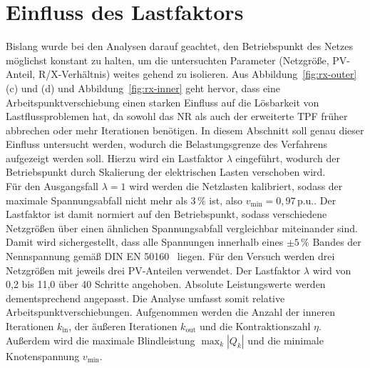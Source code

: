 \section{Einfluss des Lastfaktors}
\label{sec:lastfaktor}

Bislang wurde bei den Analysen darauf geachtet, den Betriebspunkt des Netzes möglichst konstant zu halten, um die untersuchten Parameter (Netzgröße, PV-Anteil, R/X-Verhältnis) weites gehend zu isolieren.
Aus Abbildung~\ref{fig:rx-outer} (c) und (d) und Abbildung~\ref{fig:rx-inner} geht hervor, dass eine Arbeitspunktverschiebung einen starken Einfluss auf die Lösbarkeit von Lastflussproblemen hat, da sowohl das NR als auch der erweiterte TPF früher abbrechen oder mehr Iterationen benötigen.
In diesem Abschnitt soll genau dieser Einfluss untersucht werden, wodurch die Belastungsgrenze des Verfahrens aufgezeigt werden soll.
Hierzu wird ein Lastfaktor $\lambda$ eingeführt, wodurch der Betriebspunkt durch Skalierung der elektrischen Lasten verschoben wird.\\


Für den Ausgangsfall $\lambda=1$ wird werden die Netzlasten kalibriert, sodass der maximale Spannungsabfall nicht mehr als $3\,\%$ ist, also $v_\mathrm{min}=0,97\,$p.u..
Der Lastfaktor ist damit normiert auf den Betriebspunkt, sodass verschiedene Netzgrößen über einen ähnlichen Spannungsabfall vergleichbar miteinander sind.
Damit wird sichergestellt, dass alle Spannungen innerhalb eines $\pm5\,\%$ Bandes der Nennspannung gemäß DIN EN 50160~\cite{50160} liegen.
Für den Versuch werden drei Netzgrößen mit jeweils drei PV-Anteilen verwendet.
Der Lastfaktor $\lambda$ wird von  0,2 bis 11,0  über 40 Schritte angehoben.
Absolute Leistungswerte werden dementsprechend angepasst.
Die Analyse umfasst somit relative Arbeitspunktverschiebungen.
Aufgenommen werden die Anzahl der inneren Iterationen $k_\mathrm{in}$, der äußeren Iterationen $k_\mathrm{out}$ und die Kontraktionszahl $\eta$.
Außerdem wird die maximale Blindleistung $\max_k|Q_k|$ und die minimale Knotenspannung $v_\mathrm{min}$.




